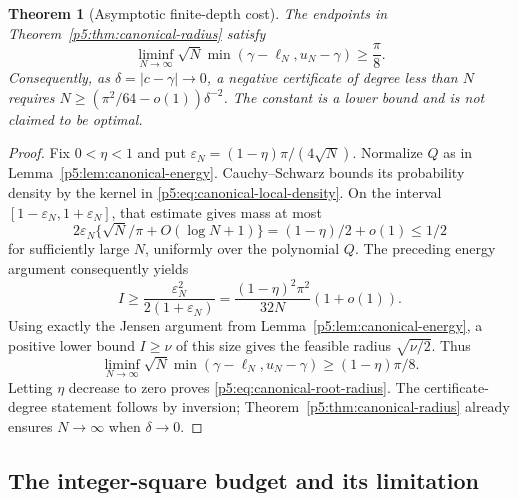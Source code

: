 \documentclass[11pt,a4paper]{article}
\newtheorem{theorem}{Theorem}[section]
\theoremstyle{definition}
\theoremstyle{remark}
\numberwithin{equation}{section}
\begin{document}
\begin{theorem}[Asymptotic finite-depth cost]\label{p5:thm:canonical-root-radius}
The endpoints in Theorem~\ref{p5:thm:canonical-radius} satisfy
\begin{equation}\label{p5:eq:canonical-root-radius}
 \liminf_{N\to\infty}\sqrt N
    \min(\gamma-\ell_N,u_N-\gamma)\geq\frac\pi8.
\end{equation}
Consequently, as $\delta=|c-\gamma|\to0$, a negative certificate
of degree less than $N$ requires
$N\geq(\pi^2/64-o(1))\delta^{-2}$.
The constant is a lower bound and is not claimed to be optimal.
\end{theorem}
\begin{proof}
Fix $0<\eta<1$ and put
$\varepsilon_N=(1-\eta)\pi/(4\sqrt N)$.
Normalize $Q$ as in Lemma~\ref{p5:lem:canonical-energy}.
Cauchy--Schwarz bounds its probability density by the kernel in
\eqref{p5:eq:canonical-local-density}.  On the interval
$[1-\varepsilon_N,1+\varepsilon_N]$, that estimate gives mass at most
\[
 2\varepsilon_N\{\sqrt N/\pi+O(\log N+1)\}
       =(1-\eta)/2+o(1)\leq1/2
\]
for sufficiently large $N$, uniformly over the polynomial $Q$.
The preceding energy argument consequently yields
\[
 I\geq\frac{\varepsilon_N^2}{2(1+\varepsilon_N)}
   =\frac{(1-\eta)^2\pi^2}{32N}(1+o(1)).
\]
Using exactly the Jensen argument from
Lemma~\ref{p5:lem:canonical-energy}, a positive lower bound $I\geq\nu$
of this size gives the feasible radius $\sqrt{\nu/2}$.
Thus
\[
 \liminf_{N\to\infty}\sqrt N
       \min(\gamma-\ell_N,u_N-\gamma)
       \geq(1-\eta)\pi/8.
\]
Letting $\eta$ decrease to zero proves
\eqref{p5:eq:canonical-root-radius}.  The certificate-degree statement
follows by inversion; Theorem~\ref{p5:thm:canonical-radius} already
ensures $N\to\infty$ when $\delta\to0$.
\end{proof}

\subsection{The integer-square budget and its limitation}
\end{document}
